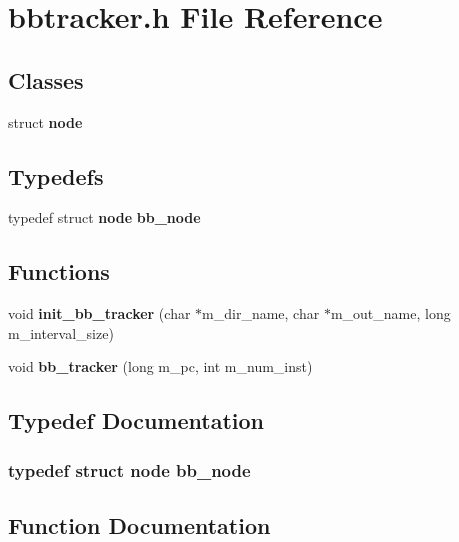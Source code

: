 \section{bbtracker.h File Reference}
\label{bbtracker_8h}
\subsection*{Classes}
\begin{CompactItemize}
\item 
struct {\bf node}
\end{CompactItemize}
\subsection*{Typedefs}
\begin{CompactItemize}
\item 
typedef struct {\bf node} {\bf bb\_\-node}
\end{CompactItemize}
\subsection*{Functions}
\begin{CompactItemize}
\item 
void {\bf init\_\-bb\_\-tracker} (char $\ast$m\_\-dir\_\-name, char $\ast$m\_\-out\_\-name, long m\_\-interval\_\-size)
\item 
void {\bf bb\_\-tracker} (long m\_\-pc, int m\_\-num\_\-inst)
\end{CompactItemize}


\subsection{Typedef Documentation}
\subsubsection[{bb\_\-node}]{\setlength{\rightskip}{0pt plus 5cm}typedef struct {\bf node}  {\bf bb\_\-node}}\label{bbtracker_8h_3eac16deb53fb4f4ce0ece2756667be7}




\subsection{Function Documentation}
